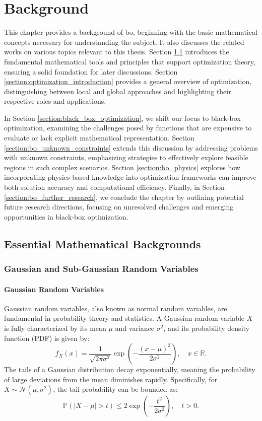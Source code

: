 \chapter{Background} %

\label{chap:background} 

This chapter provides a background of \acl{bo}, beginning with the basic mathematical concepts necessary for understanding the subject. It also discusses the related works on various topics relevant to this thesis. Section \ref{section:math_backgrounds} introduces the fundamental mathematical tools and principles that support optimization theory, ensuring a solid foundation for later discussions. Section \ref{section:optimization_introduction} provides a general overview of optimization, distinguishing between local and global approaches and highlighting their respective roles and applications.

In Section \ref{section:black_box_optimization}, we shift our focus to black-box optimization, examining the challenges posed by functions that are expensive to evaluate or lack explicit mathematical representation. Section \ref{section:bo_unknown_constraints} extends this discussion by addressing problems with unknown constraints, emphasizing strategies to effectively explore feasible regions in such complex scenarios. Section \ref{section:bo_physics} explores how incorporating physics-based knowledge into optimization frameworks can improve both solution accuracy and computational efficiency. Finally, in Section \ref{section:bo_further_research}, we conclude the chapter by outlining potential future research directions, focusing on unresolved challenges and emerging opportunities in black-box optimization.

\section{Essential Mathematical Backgrounds}
\label{section:math_backgrounds}
\subsection{Gaussian and Sub-Gaussian Random Variables}
\subsubsection{Gaussian Random Variables}  
Gaussian random variables, also known as normal random variables, are fundamental in probability theory and statistics. A Gaussian random variable \( X \) is fully characterized by its mean \( \mu \) and variance \( \sigma^2 \), and its probability density function (PDF) is given by:  
\[
f_X(x) = \frac{1}{\sqrt{2\pi \sigma^2}} \exp\left(-\frac{(x - \mu)^2}{2\sigma^2}\right), \quad x \in \mathbb{R}.
\]  
The tails of a Gaussian distribution decay exponentially, meaning the probability of large deviations from the mean diminishes rapidly. Specifically, for \( X \sim \mathcal{N}(\mu, \sigma^2) \), the tail probability can be bounded as:  
\[
\mathbb{P}(\vert X - \mu \vert > t) \leq 2 \exp\left(-\frac{t^2}{2\sigma^2}\right), \quad t > 0.
\]  

